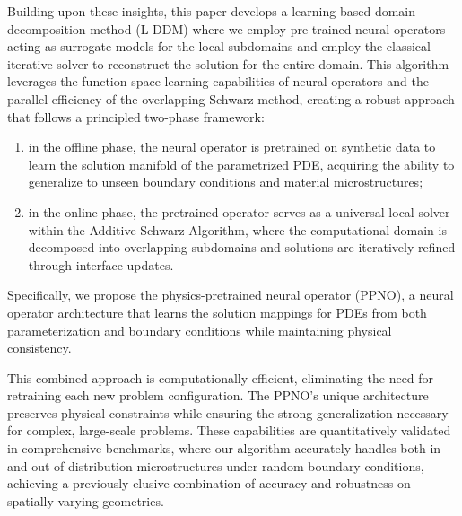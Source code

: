 \documentclass[preprint,11pt]{elsarticle}
\theoremstyle{plain}
\begin{document}
Building upon these insights, this paper develops a learning-based domain decomposition method (L-DDM) where we employ pre-trained neural operators acting as surrogate models for the local subdomains and employ the classical iterative solver to reconstruct the solution for the entire domain. This algorithm leverages the function-space learning capabilities of neural operators and the parallel efficiency of the overlapping Schwarz method, creating a robust approach that follows a principled two-phase framework: 
\begin{enumerate}
    \item in the offline phase, the neural operator is pretrained on synthetic data to learn the solution manifold of the parametrized PDE, acquiring the ability to generalize to unseen boundary conditions and material microstructures; 
    \item in the online phase, the pretrained operator serves as a universal local solver within the Additive Schwarz Algorithm, where the computational domain is decomposed into overlapping subdomains and solutions are iteratively refined through interface updates.
\end{enumerate}

Specifically, we propose the physics-pretrained neural operator (PPNO), a neural operator architecture that learns the solution mappings for PDEs from both parameterization and boundary conditions while maintaining physical consistency.

This combined approach is computationally efficient, eliminating the need for retraining each new problem configuration. The PPNO's unique architecture preserves physical constraints while ensuring the strong generalization necessary for complex, large-scale problems. These capabilities are quantitatively validated in comprehensive benchmarks, where our algorithm accurately handles both in- and out-of-distribution microstructures under random boundary conditions, achieving a previously elusive combination of accuracy and robustness on spatially varying geometries.

\end{document}
